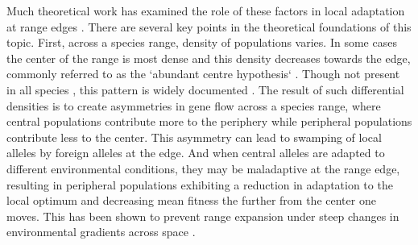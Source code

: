 
Much theoretical work has examined the role of these factors in local adaptation at range edges \citep{GarciaRamos:1997,Ibrahim:1996,Gomulkiewicz:1995,Atkins:2010}. There are several key points in the theoretical foundations of this topic. First, across a species range, density of populations varies. In some cases the center of the range is most dense and this density decreases towards the edge, commonly referred to as the `abundant centre hypothesis` \citep{Brown:1984}. Though not present in all species \citep{Sagarin:2006}, this pattern is widely documented \citep{Antonovics:1976,Yeh:1979,Eckert:2008}. %
The result of such differential densities is to create asymmetries in gene flow across a species range, where central populations contribute more to the periphery while peripheral populations contribute less to the center. This asymmetry can lead to swamping of local alleles by foreign alleles at the edge. And when central alleles are adapted to different environmental conditions, they may be maladaptive at the range edge, resulting in peripheral populations exhibiting a reduction in adaptation to the local optimum and decreasing mean fitness the further from the center one moves. This has been shown to prevent range expansion under steep changes in environmental gradients across space \citep{Kirkpatrick:1997}.


